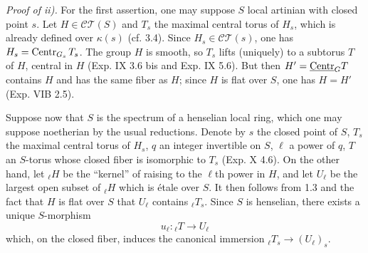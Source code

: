 \par\noindent\emph{Proof of ii).}
For the first assertion, one may suppose $S$ local artinian with closed point $s$. Let $H\in\mathscr{CT}(S)$ and $T_s$ the maximal central torus of $H_s$, which is already defined over $\kappa(s)$ (cf. 3.4). Since $H_s\in\mathscr{CT}(s)$, one has $H_s=\operatorname{Centr}_{G_s}T_s$. The group $H$ is smooth, so $T_s$ lifts (uniquely) to a subtorus $T$ of $H$, central in $H$ (Exp. IX 3.6 bis and Exp. IX 5.6). But then $H'=\underline{\mathrm{Centr}}_G T$ contains $H$ and has the same fiber as $H$; since $H$ is flat over $S$, one has $H=H'$ (Exp. VIB 2.5).

Suppose now that $S$ is the spectrum of a henselian local ring, which one may suppose noetherian by the usual reductions. Denote by $s$ the closed point of $S$, $T_s$ the maximal central torus of $H_s$, $q$ an integer invertible on $S$, $\ell$ a power of $q$, $T$ an $S$-torus whose closed fiber is isomorphic to $T_s$ (Exp. X 4.6). On the other hand, let ${}_\ell H$ be the ``kernel'' of raising to the $\ell$th power in $H$, and let $U_\ell$ be the largest open subset of ${}_\ell H$ which is étale over $S$. It then follows from 1.3 and the fact that $H$ is flat over $S$ that $U_\ell$ contains ${}_\ell T_s$. Since $S$ is henselian, there exists a unique $S$-morphism
\[
u_\ell:{}_\ell T\longrightarrow U_\ell
\]
which, on the closed fiber, induces the canonical immersion ${}_\ell T_s\to(U_\ell)_s$.
